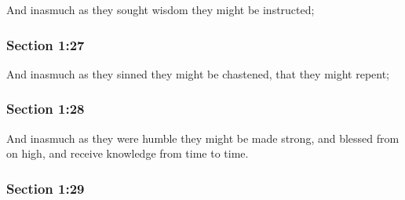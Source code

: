 		And inasmuch as they sought wisdom they might be instructed;


	\subsubsection{Section 1:27} %
		\label{DC1-27}

		And inasmuch as they sinned they might be chastened, that they might repent;


	\subsubsection{Section 1:28} %
		\label{DC1-28}

		And inasmuch as they were humble they might be made strong, and blessed from on high, and receive knowledge from time to time.


	\subsubsection{Section 1:29} %
		\label{DC1-29}

